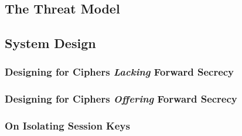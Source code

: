 \documentclass[../main.tex]{subfiles}
\begin{document}
\subsection{The Threat Model}


\subsection{System Design} %


\subsubsection{Designing for Ciphers \textit{Lacking} Forward Secrecy}


\subsubsection{Designing for Ciphers \textit{Offering} Forward Secrecy}


\subsubsection{On Isolating Session Keys}

\end{document}
